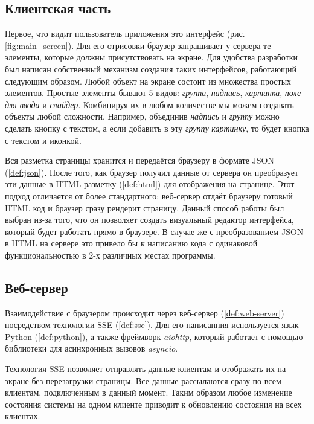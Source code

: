 \subsection{Клиентская часть}

Первое, что видит пользователь приложения это интерфейс (рис. \ref{fig:main_screen}). Для его отрисовки браузер запрашивает
у сервера те элементы, которые должны присутствовать на экране. Для удобства разработки был написан собственный механизм
создания таких интерфейсов, работающий следующим образом. Любой объект на экране состоит из множества простых элементов.
Простые элементы бывают 5 видов: \textit{группа}, \textit{надпись}, \textit{картинка}, \textit{поле для ввода} и
\textit{слайдер}. Комбинируя их в любом количестве мы можем создавать объекты любой сложности. Например, объединив
\textit{надпись} и \textit{группу} можно сделать кнопку с текстом, а если добавить в эту \textit{группу} \textit{картинку},
то будет кнопка с текстом и иконкой.

Вся разметка страницы хранится и передаётся браузеру в формате JSON (\ref{def:json}). После того, как браузер
получил данные от сервера он преобразует эти данные в HTML разметку (\ref{def:html}) для отображения на странице. Этот подход
отличается от более стандартного: веб-сервер отдаёт браузеру готовый HTML код и браузер сразу рендерит страницу.
Данный способ работы был выбран из-за того, что он позволяет создать визуальный редактор интерфейса, который будет работать
прямо в браузере. В случае же с преобразованием JSON в HTML на сервере это привело бы к написанию кода с одинаковой
функциональностью в 2-х различных местах программы.

\subsection{Веб-сервер}

Взаимодействие с браузером происходит через веб-сервер (\ref{def:web-server}) посредством технологии SSE (\ref{def:sse}).
Для его написанния используется язык Python (\ref{def:python}), а также фреймворк \textit{aiohttp}, который работает с
помощью библиотеки для асинхронных вызовов \textit{asyncio}.

Технология SSE позволяет отправлять данные клиентам и отображать их на экране без перезагрузки страницы. Все данные
рассылаются сразу по всем клиентам, подключенным в данный момент. Таким образом любое изменение состояния системы на одном
клиенте приводит к обновлению состояния на всех клиентах.

